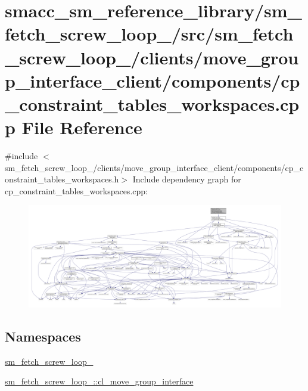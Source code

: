 \hypertarget{sm__fetch__screw__loop__1_2src_2sm__fetch__screw__loop__1_2clients_2move__group__interface__cliea9127a8bf4c5b4aa0723f6a4b59a622c}{}\section{smacc\+\_\+sm\+\_\+reference\+\_\+library/sm\+\_\+fetch\+\_\+screw\+\_\+loop\+\_/src/sm\+\_\+fetch\+\_\+screw\+\_\+loop\+\_/clients/move\+\_\+group\+\_\+interface\+\_\+client/components/cp\+\_\+constraint\+\_\+tables\+\_\+workspaces.cpp File Reference}
\label{sm__fetch__screw__loop__1_2src_2sm__fetch__screw__loop__1_2clients_2move__group__interface__cliea9127a8bf4c5b4aa0723f6a4b59a622c}
{\ttfamily \#include $<$sm\+\_\+fetch\+\_\+screw\+\_\+loop\+\_/clients/move\+\_\+group\+\_\+interface\+\_\+client/components/cp\+\_\+constraint\+\_\+tables\+\_\+workspaces.\+h$>$}\newline
Include dependency graph for cp\+\_\+constraint\+\_\+tables\+\_\+workspaces.\+cpp\+:
\nopagebreak
\begin{figure}[H]
\begin{center}
\leavevmode
\includegraphics[width=350pt]{sm__fetch__screw__loop__1_2src_2sm__fetch__screw__loop__1_2clients_2move__group__interface__clie9125aeee9cd623ce098f45f8d5990e51}
\end{center}
\end{figure}
\subsection*{Namespaces}
\begin{DoxyCompactItemize}
\item 
 \hyperlink{namespacesm__fetch__screw__loop__1}{sm\+\_\+fetch\+\_\+screw\+\_\+loop\+\_}
\item 
 \hyperlink{namespacesm__fetch__screw__loop__1_1_1cl__move__group__interface}{sm\+\_\+fetch\+\_\+screw\+\_\+loop\+\_\+::cl\+\_\+move\+\_\+group\+\_\+interface}
\end{DoxyCompactItemize}

